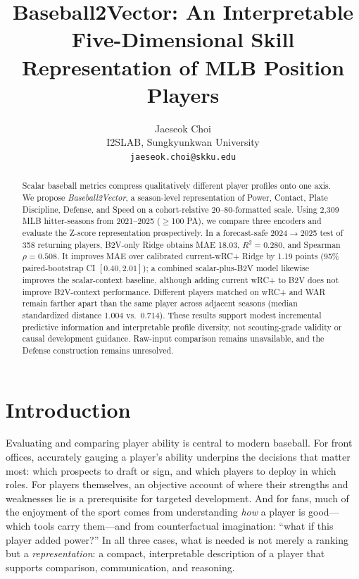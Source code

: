 \documentclass[10pt,twocolumn,letterpaper]{article}
\begin{document}
\title{Baseball2Vector: An Interpretable Five-Dimensional Skill Representation of MLB Position Players}

\author{Jaeseok Choi\\
I2SLAB, Sungkyunkwan University\\
{\tt\small jaeseok.choi@skku.edu}
}

\maketitle

\begin{abstract}
Scalar baseball metrics compress qualitatively different player profiles onto one axis. We propose \emph{Baseball2Vector}, a season-level representation of Power, Contact, Plate Discipline, Defense, and Speed on a cohort-relative 20--80-formatted scale. Using 2{,}309 MLB hitter-seasons from 2021--2025 ($\geq$100 PA), we compare three encoders and evaluate the Z-score representation prospectively. In a forecast-safe 2024$\to$2025 test of 358 returning players, B2V-only Ridge obtains MAE 18.03, $R^2=0.280$, and Spearman $\rho=0.508$. It improves MAE over calibrated current-wRC+ Ridge by 1.19 points (95\% paired-bootstrap CI $[0.40,2.01]$); a combined scalar-plus-B2V model likewise improves the scalar-context baseline, although adding current wRC+ to B2V does not improve B2V-context performance. Different players matched on wRC+ and WAR remain farther apart than the same player across adjacent seasons (median standardized distance 1.004 vs.\ 0.714). These results support modest incremental predictive information and interpretable profile diversity, not scouting-grade validity or causal development guidance. Raw-input comparison remains unavailable, and the Defense construction remains unresolved.
\end{abstract}

\section{Introduction}
\label{sec:intro}

Evaluating and comparing player ability is central to modern baseball. For front offices, accurately gauging a player's ability underpins the decisions that matter most: which prospects to draft or sign, and which players to deploy in which roles. For players themselves, an objective account of where their strengths and weaknesses lie is a prerequisite for targeted development. And for fans, much of the enjoyment of the sport comes from understanding \emph{how} a player is good---which tools carry them---and from counterfactual imagination: ``what if this player added power?'' In all three cases, what is needed is not merely a ranking but a \emph{representation}: a compact, interpretable description of a player that supports comparison, communication, and reasoning.
\end{document}
